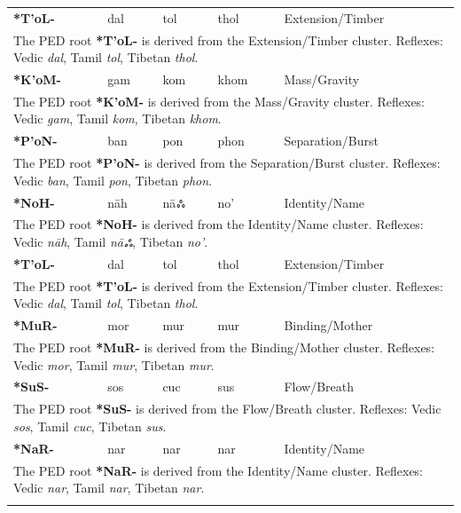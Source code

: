 \begin{longtable}{p{} p{} p{} p{} p{}}
\textbf{*T'oL-} & dal & tol & thol & Extension/Timber \\ 
\multicolumn{5}{p{\textwidth}}{\small The PED root \textbf{*T'oL-} is derived from the Extension/Timber cluster. Reflexes: Vedic \textit{dal}, Tamil \textit{tol}, Tibetan \textit{thol}. } \\ \addlinespace 
\textbf{*K'oM-} & gam & kom & khom & Mass/Gravity \\ 
\multicolumn{5}{p{\textwidth}}{\small The PED root \textbf{*K'oM-} is derived from the Mass/Gravity cluster. Reflexes: Vedic \textit{gam}, Tamil \textit{kom}, Tibetan \textit{khom}. } \\ \addlinespace 
\textbf{*P'oN-} & ban & pon & phon & Separation/Burst \\ 
\multicolumn{5}{p{\textwidth}}{\small The PED root \textbf{*P'oN-} is derived from the Separation/Burst cluster. Reflexes: Vedic \textit{ban}, Tamil \textit{pon}, Tibetan \textit{phon}. } \\ \addlinespace 
\textbf{*NoH-} & nāh & nāஃ & no' & Identity/Name \\ 
\multicolumn{5}{p{\textwidth}}{\small The PED root \textbf{*NoH-} is derived from the Identity/Name cluster. Reflexes: Vedic \textit{nāh}, Tamil \textit{nāஃ}, Tibetan \textit{no'}. } \\ \addlinespace 
\textbf{*T'oL-} & dal & tol & thol & Extension/Timber \\ 
\multicolumn{5}{p{\textwidth}}{\small The PED root \textbf{*T'oL-} is derived from the Extension/Timber cluster. Reflexes: Vedic \textit{dal}, Tamil \textit{tol}, Tibetan \textit{thol}. } \\ \addlinespace 
\textbf{*MuR-} & mor & mur & mur & Binding/Mother \\ 
\multicolumn{5}{p{\textwidth}}{\small The PED root \textbf{*MuR-} is derived from the Binding/Mother cluster. Reflexes: Vedic \textit{mor}, Tamil \textit{mur}, Tibetan \textit{mur}. } \\ \addlinespace 
\textbf{*SuS-} & sos & cuc & sus & Flow/Breath \\ 
\multicolumn{5}{p{\textwidth}}{\small The PED root \textbf{*SuS-} is derived from the Flow/Breath cluster. Reflexes: Vedic \textit{sos}, Tamil \textit{cuc}, Tibetan \textit{sus}. } \\ \addlinespace 
\textbf{*NaR-} & nar & nar & nar & Identity/Name \\ 
\multicolumn{5}{p{\textwidth}}{\small The PED root \textbf{*NaR-} is derived from the Identity/Name cluster. Reflexes: Vedic \textit{nar}, Tamil \textit{nar}, Tibetan \textit{nar}. } \\ \addlinespace 

\end{longtable}
